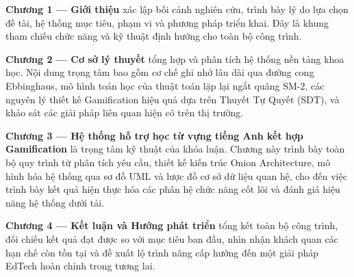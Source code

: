 \textbf{Chương 1 — Giới thiệu} xác lập bối cảnh nghiên cứu, trình bày lý do lựa chọn đề tài, hệ thống mục tiêu, phạm vi và phương pháp triển khai. Đây là khung tham chiếu chức năng và kỹ thuật định hướng cho toàn bộ công trình.

\textbf{Chương 2 — Cơ sở lý thuyết} tổng hợp và phân tích hệ thống nền tảng khoa học. Nội dung trọng tâm bao gồm cơ chế ghi nhớ lâu dài qua đường cong Ebbinghaus, mô hình toán học của thuật toán lặp lại ngắt quãng SM-2, các nguyên lý thiết kế Gamification hiệu quả dựa trên Thuyết Tự Quyết (SDT), và khảo sát các giải pháp liên quan hiện có trên thị trường.

\textbf{Chương 3 — Hệ thống hỗ trợ học từ vựng tiếng Anh kết hợp Gamification} là trọng tâm kỹ thuật của khóa luận. Chương này trình bày toàn bộ quy trình từ phân tích yêu cầu, thiết kế kiến trúc Onion Architecture, mô hình hóa hệ thống qua sơ đồ UML và lược đồ cơ sở dữ liệu quan hệ, cho đến việc trình bày kết quả hiện thực hóa các phân hệ chức năng cốt lõi và đánh giá hiệu năng hệ thống dưới tải.

\textbf{Chương 4 — Kết luận và Hướng phát triển} tổng kết toàn bộ công trình, đối chiếu kết quả đạt được so với mục tiêu ban đầu, nhìn nhận khách quan các hạn chế còn tồn tại và đề xuất lộ trình nâng cấp hướng đến một giải pháp EdTech hoàn chỉnh trong tương lai.
